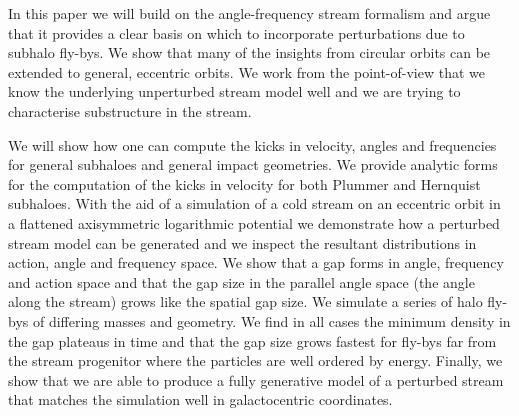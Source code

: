 \documentclass[useAMS,usenatbib,fleqn,a4paper]{mn2e}
\begin{document}
In this paper we will build on the angle-frequency stream formalism and argue that it provides a clear basis on which to incorporate perturbations due to subhalo fly-bys. We show that many of the insights from circular orbits can be extended to general, eccentric orbits. We work from the point-of-view that we know the underlying unperturbed stream model well and we are trying to characterise substructure in the stream.

We will show how one can compute the kicks in velocity, angles and frequencies for general subhaloes and general impact geometries. We provide analytic forms for the computation of the kicks in velocity for both Plummer and Hernquist subhaloes. With the aid of a simulation of a cold stream on an eccentric orbit in a flattened axisymmetric logarithmic potential we demonstrate how a perturbed stream model can be generated and we inspect the resultant distributions in action, angle and frequency space. We show that a gap forms in angle, frequency and action space and that the gap size in the parallel angle space (the angle along the stream) grows like the spatial gap size. We simulate a series of halo fly-bys of differing masses and geometry. We find in all cases the minimum density in the gap plateaus in time and that the gap size grows fastest for fly-bys far from the stream progenitor where the particles are well ordered by energy. Finally, we show that we are able to produce a fully generative model of a perturbed stream that matches the simulation well in galactocentric coordinates.
\end{document}
